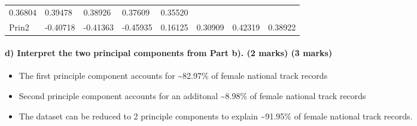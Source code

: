 \documentclass[11pt]{article}
\providecommand{\tightlist}{%
      \setlength{\itemsep}{0pt}\setlength{\parskip}{0pt}}
\begin{document}
\begin{longtable}[]{@{}llllllll@{}}
\begin{minipage}[t]{0.10\columnwidth}
0.36804\strut
\end{minipage} & \begin{minipage}[t]{0.10\columnwidth}\raggedright
0.39478\strut
\end{minipage} & \begin{minipage}[t]{0.10\columnwidth}\raggedright
0.38926\strut
\end{minipage} & \begin{minipage}[t]{0.10\columnwidth}\raggedright
0.37609\strut
\end{minipage} & \begin{minipage}[t]{0.10\columnwidth}\raggedright
0.35520\strut
\end{minipage}\tabularnewline
\begin{minipage}[t]{0.10\columnwidth}\raggedright
Prin2\strut
\end{minipage} & \begin{minipage}[t]{0.10\columnwidth}\raggedright
-0.40718\strut
\end{minipage} & \begin{minipage}[t]{0.10\columnwidth}\raggedright
-0.41363\strut
\end{minipage} & \begin{minipage}[t]{0.10\columnwidth}\raggedright
-0.45935\strut
\end{minipage} & \begin{minipage}[t]{0.10\columnwidth}\raggedright
0.16125\strut
\end{minipage} & \begin{minipage}[t]{0.10\columnwidth}\raggedright
0.30909\strut
\end{minipage} & \begin{minipage}[t]{0.10\columnwidth}\raggedright
0.42319\strut
\end{minipage} & \begin{minipage}[t]{0.10\columnwidth}\raggedright
0.38922\strut
\end{minipage}\tabularnewline
\bottomrule
\end{longtable}

    \hypertarget{d-interpret-the-two-principal-components-from-part-b.-2-marks-3-marks}{%
\paragraph{d) Interpret the two principal components from Part b). (2
marks) (3
marks)}\label{d-interpret-the-two-principal-components-from-part-b.-2-marks-3-marks}}

    \begin{itemize}
\tightlist
\item
  The first principle component accounts for \textasciitilde{}82.97\% of
  female national track records
\item
  Second principle component accounts for an additonal
  \textasciitilde{}8.98\% of female national track records
\item
  The dataset can be reduced to 2 principle components to explain
  \textasciitilde{}91.95\% of female national track records.
\end{itemize}
\end{document}

